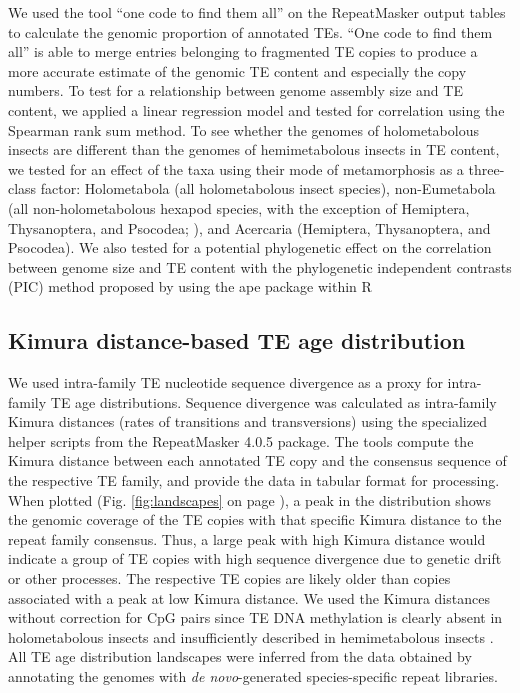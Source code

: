 We used the tool ``one code to find them all'' \citep{Bailly-Bechet2014}
on the RepeatMasker output tables to calculate the genomic proportion of
annotated TEs. ``One code to find them all'' is able to merge entries
belonging to fragmented TE copies to produce a more accurate estimate of
the genomic TE content and especially the copy numbers. To test for a
relationship between genome assembly size and TE content, we applied a
linear regression model and tested for correlation using the Spearman
rank sum method. To see whether the genomes of holometabolous insects
are different than the genomes of hemimetabolous insects in TE content,
we tested for an effect of the taxa using their mode of metamorphosis as
a three-class factor: Holometabola (all holometabolous insect species),
non-Eumetabola (all non-holometabolous hexapod species, with the
exception of Hemiptera, Thysanoptera, and Psocodea;
\citet{Beutel2013}), and Acercaria (Hemiptera, Thysanoptera, and
Psocodea). We also tested for a potential phylogenetic effect on the
correlation between genome size and TE content with the phylogenetic
independent contrasts (PIC) method proposed by \citet{Felsenstein1985}
using the ape package \citep{Paradis2004} within R \citep{RCoreTeam2017}





\subsection{Kimura distance-based TE age
distribution}\label{kimura-distance-based-te-age-distribution}

We used intra-family TE nucleotide sequence divergence as a proxy for
intra-family TE age distributions. Sequence divergence was calculated as
intra-family Kimura distances (rates of transitions and transversions)
using the specialized helper scripts from the RepeatMasker 4.0.5
package. The tools compute the Kimura distance between each annotated TE
copy and the consensus sequence of the respective TE family, and provide
the data in tabular format for processing. When plotted (Fig.
\ref{fig:landscapes} on page \pageref{fig:landscapes}), a peak in the
distribution shows the genomic coverage of the TE copies with that
specific Kimura distance to the repeat family consensus. Thus, a large
peak with high Kimura distance would indicate a group of TE copies with
high sequence divergence due to genetic drift or other processes.  The
respective TE copies are likely older than copies associated with a peak
at low Kimura distance. We used the Kimura distances without correction
for CpG pairs since TE DNA methylation is clearly absent in
holometabolous insects and insufficiently described in hemimetabolous
insects \citep{Glastad2014}.  All TE age distribution landscapes were
inferred from the data obtained by annotating the genomes with \emph{de
novo}-generated species-specific repeat libraries.

